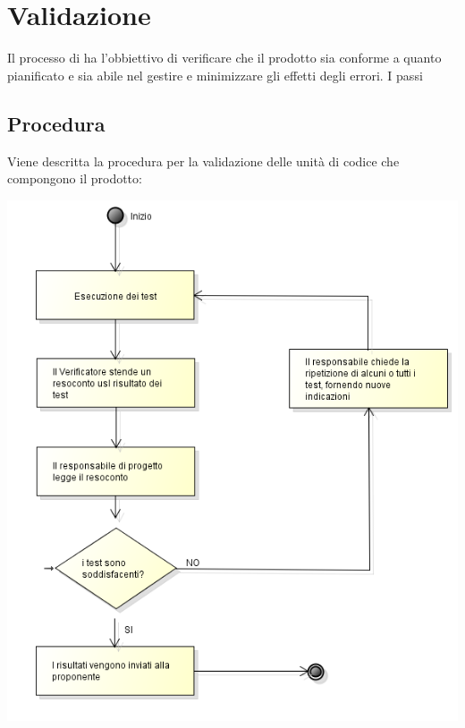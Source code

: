 \section{Validazione}
\label{Validazione}
Il processo di  ha l'obbiettivo di verificare che il prodotto sia conforme a quanto pianificato e sia abile nel gestire e minimizzare gli effetti degli errori.
I passi 

\subsection{Procedura}
Viene descritta la procedura per la validazione delle unità di codice che compongono il prodotto:

\begin{center}
		\includegraphics[scale=0.60]{images/uml.png}
\end{center}
